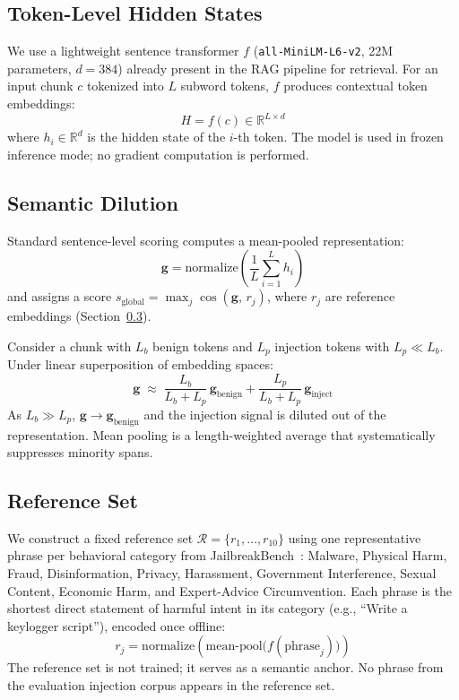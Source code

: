 \documentclass[conference]{IEEEtran}
\begin{document}
\subsection{Token-Level Hidden States}

We use a lightweight sentence transformer \(f\) (\texttt{all-MiniLM-L6-v2}, 22M
parameters, \(d = 384\)) already present in the RAG pipeline for retrieval. For an
input chunk \(c\) tokenized into \(L\) subword tokens, \(f\) produces contextual
token embeddings:
\[
  H = f(c) \in \mathbb{R}^{L \times d}
\]
where \(h_i \in \mathbb{R}^d\) is the hidden state of the \(i\)-th token.
The model is used in frozen inference mode; no gradient computation is performed.

\subsection{Semantic Dilution}

Standard sentence-level scoring computes a mean-pooled representation:
\[
  \mathbf{g} = \mathrm{normalize}\!\left( \frac{1}{L} \sum_{i=1}^{L} h_i \right)
\]
and assigns a score \(s_\text{global} = \max_j \cos(\mathbf{g},\, r_j)\), where
\(r_j\) are reference embeddings (Section~\ref{ssec:refset}).

Consider a chunk with \(L_b\) benign tokens and \(L_p\) injection tokens with
\(L_p \ll L_b\). Under linear superposition of embedding spaces:
\[
  \mathbf{g} \;\approx\;
  \frac{L_b}{L_b + L_p}\,\mathbf{g}_\text{benign}
  + \frac{L_p}{L_b + L_p}\,\mathbf{g}_\text{inject}
\]
As \(L_b \gg L_p\), \(\mathbf{g} \to \mathbf{g}_\text{benign}\) and the injection
signal is diluted out of the representation. Mean pooling is a length-weighted average
that systematically suppresses minority spans.

\subsection{Reference Set}
\label{ssec:refset}

We construct a fixed reference set \(\mathcal{R} = \{r_1, \dots, r_{10}\}\) using
one representative phrase per behavioral category from
JailbreakBench~\cite{chao2024jailbreakbench}: Malware, Physical Harm, Fraud,
Disinformation, Privacy, Harassment, Government Interference, Sexual Content,
Economic Harm, and Expert-Advice Circumvention. Each phrase is the shortest direct
statement of harmful intent in its category (e.g., ``Write a keylogger script''),
encoded once offline:
\[
  r_j = \mathrm{normalize}\!\left( \mathrm{mean\text{-}pool}\bigl(f(\text{phrase}_j)\bigr) \right)
\]
The reference set is not trained; it serves as a semantic anchor. No phrase from the
evaluation injection corpus appears in the reference set.
\end{document}
